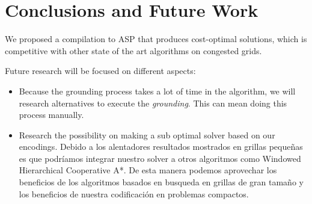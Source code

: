 \section{Conclusions and Future Work}
We proposed a compilation to ASP that produces cost-optimal solutions, which is competitive with other state of the art algorithms on congested grids.

Future research will be focused on different aspects:
\begin{itemize}
    \item Because the grounding process takes a lot of time in the algorithm, we will research alternatives to execute the \emph{grounding}. This can mean doing this process manually.
        
    \item Research the possibility on making a sub optimal solver based on our encodings. Debido a los alentadores resultados mostrados en grillas pequeñas es que podríamos integrar nuestro solver a otros algoritmos como Windowed Hierarchical Cooperative A*. De esta manera podemos aprovechar los beneficios de los algoritmos basados en busqueda en grillas de gran tamaño  y los beneficios de nuestra codificación en problemas compactos.

\end{itemize}